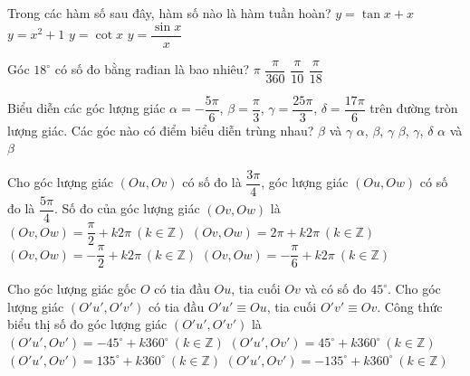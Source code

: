 \begin{ex}%
	Trong các hàm số sau đây, hàm số nào là hàm tuần hoàn?
	\choice
	{$y=\tan x+x$}
	{$y=x^2+1$}
	{\True $y=\cot x$}
	{$y=\dfrac{\sin x}{x}$}
\end{ex}

\begin{ex}%
	Góc $18^\circ$ có số đo bằng rađian là bao nhiêu?
	\choice
	{$\pi$}
	{$\dfrac{\pi}{360}$}
	{\True $\dfrac{\pi}{10}$}
	{$\dfrac{\pi}{18}$}
\end{ex}

\begin{ex}%
	Biểu diễn các góc lượng giác $\alpha=-\dfrac{5\pi}{6}$, $\beta=\dfrac{\pi}{3}$, $\gamma=\dfrac{25\pi}{3}$, $\delta=\dfrac{17\pi}{6}$ trên đường tròn lượng giác. Các góc nào có điểm biểu diễn trùng nhau?
	\choice
	{\True $\beta$ và $\gamma$}
	{$\alpha$, $\beta$, $\gamma$}
	{$\beta$, $\gamma$, $\delta$}
	{$\alpha$ và $\beta$}
\end{ex}

\begin{ex}%
	Cho góc lượng giác $(Ou,Ov)$ có số đo là $\dfrac{3\pi}{4}$, góc lượng giác $(Ou,Ow)$ có số đo là $\dfrac{5\pi}{4}$. Số đo của góc lượng giác $(Ov,Ow)$ là
	\choice
	{\True $(Ov,Ow)=\dfrac{\pi}{2}+k2\pi\ (k\in \mathbb{Z})$}
	{$(Ov,Ow)=2\pi+k2\pi\ (k\in \mathbb{Z})$}
	{$(Ov,Ow)=-\dfrac{\pi}{2}+k2\pi\ (k\in \mathbb{Z})$}
	{$(Ov,Ow)=-\dfrac{\pi}{6}+k2\pi\ (k\in \mathbb{Z})$}
\end{ex}

\begin{ex}%
	Cho góc lượng giác gốc $O$ có tia đầu $Ou$, tia cuối $Ov$ và có số đo $45^\circ$. Cho góc lượng giác $(O'u',O'v')$ có tia đầu $O'u'\equiv Ou$, tia cuối $O'v'\equiv Ov$. Công thức biểu thị số đo góc lượng giác $(O'u',O'v')$ là
	\choice
	{$(O'u',Ov')=-45^\circ+k360^\circ\ (k\in \mathbb{Z})$}
	{\True $(O'u',Ov')=45^\circ+k360^\circ\ (k\in \mathbb{Z})$}
	{$(O'u',Ov')=135^\circ+k360^\circ\ (k\in \mathbb{Z})$}
	{$(O'u',Ov')=-135^\circ+k360^\circ\ (k\in \mathbb{Z})$}
\end{ex}

